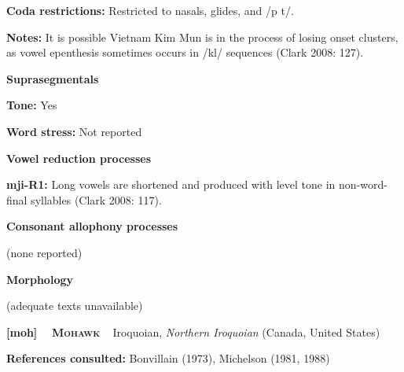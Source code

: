 \begin{styleBody}
\textbf{Coda restrictions: }Restricted to nasals, glides, and /p t/.
\end{styleBody}

\begin{styleBody}
\textbf{Notes: }It is possible Vietnam Kim Mun is in the process of losing onset clusters, as vowel epenthesis sometimes occurs in /kl/ sequences (Clark 2008: 127).
\end{styleBody}

\begin{styleBody}
\textbf{Suprasegmentals}
\end{styleBody}

\begin{styleBody}
\textbf{Tone:} Yes
\end{styleBody}

\begin{styleBody}
\textbf{Word stress:} Not reported
\end{styleBody}

\begin{styleBody}
\textbf{Vowel reduction processes}
\end{styleBody}

\begin{styleBody}
\textbf{mji-R1:} Long vowels are shortened and produced with level tone in non-word-final syllables (Clark 2008: 117).
\end{styleBody}

\begin{styleBody}
\textbf{Consonant allophony processes}
\end{styleBody}

\begin{styleBody}
(none reported)
\end{styleBody}

\begin{styleBody}
\textbf{Morphology}
\end{styleBody}

\begin{styleBody}
(adequate texts unavailable)
\end{styleBody}

\clearpage\begin{styleBody}
\textbf{[moh] }\ \ \textbf{\textsc{Mohawk}}\textbf{\ \ }Iroquoian, \textit{Northern Iroquoian} (Canada, United States)
\end{styleBody}

\begin{styleBody}
\textbf{References consulted: }Bonvillain (1973), Michelson (1981, 1988)
\end{styleBody}

